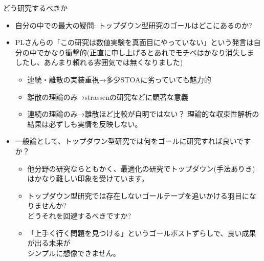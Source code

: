 \documentclass[13pt,aspectratio=169,table,dvipdfmx]{beamer}
\begin{document}
    \begin{frame}{\LARGE{どう研究するべきか}}
        \begin{itemize}
            \item 自分の中での最大の疑問: トップダウン型研究のゴールはどこにあるのか?
            \item PLさんらの「この研究は数値実験を真面目にやっていない」という発言は自分の中でかなり衝撃的(正直に申し上げるとあれでモチベはかなり消失しましたし、あんまり頼れる雰囲気では無くなりました)
                  \begin{itemize}
                      \item 連続・離散の実装重視→多少STOAに劣っていても魅力的
                      \item 離散の理論のみ→strassenの研究などに顕著な意義
                      \item 連続の理論のみ→離散ほど比較が自明ではない？ 理論的な収束性解析の結果は必ずしも実情を反映しない。
                  \end{itemize}
            \item 一般論として、トップダウン型研究では何をゴールに研究すれば良いですか？
                  \begin{itemize}
                      \item 他分野の研究ならともかく、最適化の研究でトップダウン(手法ありき)はかなり難しい印象を受けています。
                      \item トップダウン型研究では存在しないゴールテープを追いかける羽目になりませんか?\\どうそれを回避するべきですか?
                      \item 「上手く行く問題を見つける」というゴールポストずらしで、良い成果が出る未来が\\シンプルに想像できません。
                  \end{itemize}
        \end{itemize}
    \end{frame}
\end{document}

